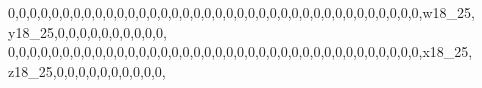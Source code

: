 \documentclass[]{article}
\newenvironment{Shaded}{\begin{snugshade}}{\end{snugshade}}
\newcommand{\DecValTok}[1]{\textcolor[rgb]{0.00,0.00,0.81}{#1}}
\newcommand{\NormalTok}[1]{#1}
\begin{document}
\begin{Shaded}
\begin{Highlighting}[]
\DecValTok{0}\NormalTok{,}\DecValTok{0}\NormalTok{,}\DecValTok{0}\NormalTok{,}\DecValTok{0}\NormalTok{,}\DecValTok{0}\NormalTok{,}\DecValTok{0}\NormalTok{,}\DecValTok{0}\NormalTok{,}\DecValTok{0}\NormalTok{,}\DecValTok{0}\NormalTok{,}\DecValTok{0}\NormalTok{,}\DecValTok{0}\NormalTok{,}\DecValTok{0}\NormalTok{,}\DecValTok{0}\NormalTok{,}\DecValTok{0}\NormalTok{,}\DecValTok{0}\NormalTok{,}\DecValTok{0}\NormalTok{,}\DecValTok{0}\NormalTok{,}\DecValTok{0}\NormalTok{,}\DecValTok{0}\NormalTok{,}\DecValTok{0}\NormalTok{,}\DecValTok{0}\NormalTok{,}\DecValTok{0}\NormalTok{,}\DecValTok{0}\NormalTok{,}\DecValTok{0}\NormalTok{,}\DecValTok{0}\NormalTok{,}\DecValTok{0}\NormalTok{,}\DecValTok{0}\NormalTok{,}\DecValTok{0}\NormalTok{,}\DecValTok{0}\NormalTok{,}\DecValTok{0}\NormalTok{,}\DecValTok{0}\NormalTok{,}\DecValTok{0}\NormalTok{,}\DecValTok{0}\NormalTok{,}\DecValTok{0}\NormalTok{,}\DecValTok{0}\NormalTok{,}\DecValTok{0}\NormalTok{,}\DecValTok{0}\NormalTok{,}\DecValTok{0}\NormalTok{,w18_}\DecValTok{25}\NormalTok{, y18_}\DecValTok{25}\NormalTok{,}\DecValTok{0}\NormalTok{,}\DecValTok{0}\NormalTok{,}\DecValTok{0}\NormalTok{,}\DecValTok{0}\NormalTok{,}\DecValTok{0}\NormalTok{,}\DecValTok{0}\NormalTok{,}\DecValTok{0}\NormalTok{,}\DecValTok{0}\NormalTok{,}\DecValTok{0}\NormalTok{,}\DecValTok{0}\NormalTok{,}
\DecValTok{0}\NormalTok{,}\DecValTok{0}\NormalTok{,}\DecValTok{0}\NormalTok{,}\DecValTok{0}\NormalTok{,}\DecValTok{0}\NormalTok{,}\DecValTok{0}\NormalTok{,}\DecValTok{0}\NormalTok{,}\DecValTok{0}\NormalTok{,}\DecValTok{0}\NormalTok{,}\DecValTok{0}\NormalTok{,}\DecValTok{0}\NormalTok{,}\DecValTok{0}\NormalTok{,}\DecValTok{0}\NormalTok{,}\DecValTok{0}\NormalTok{,}\DecValTok{0}\NormalTok{,}\DecValTok{0}\NormalTok{,}\DecValTok{0}\NormalTok{,}\DecValTok{0}\NormalTok{,}\DecValTok{0}\NormalTok{,}\DecValTok{0}\NormalTok{,}\DecValTok{0}\NormalTok{,}\DecValTok{0}\NormalTok{,}\DecValTok{0}\NormalTok{,}\DecValTok{0}\NormalTok{,}\DecValTok{0}\NormalTok{,}\DecValTok{0}\NormalTok{,}\DecValTok{0}\NormalTok{,}\DecValTok{0}\NormalTok{,}\DecValTok{0}\NormalTok{,}\DecValTok{0}\NormalTok{,}\DecValTok{0}\NormalTok{,}\DecValTok{0}\NormalTok{,}\DecValTok{0}\NormalTok{,}\DecValTok{0}\NormalTok{,}\DecValTok{0}\NormalTok{,}\DecValTok{0}\NormalTok{,}\DecValTok{0}\NormalTok{,}\DecValTok{0}\NormalTok{,x18_}\DecValTok{25}\NormalTok{, z18_}\DecValTok{25}\NormalTok{,}\DecValTok{0}\NormalTok{,}\DecValTok{0}\NormalTok{,}\DecValTok{0}\NormalTok{,}\DecValTok{0}\NormalTok{,}\DecValTok{0}\NormalTok{,}\DecValTok{0}\NormalTok{,}\DecValTok{0}\NormalTok{,}\DecValTok{0}\NormalTok{,}\DecValTok{0}\NormalTok{,}\DecValTok{0}\NormalTok{,}

\end{Highlighting}
\end{Shaded}
\end{document}
